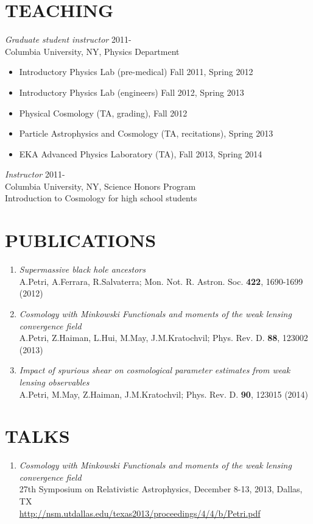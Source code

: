 \documentclass[margin, 10pt]{res} %
\begin{document}
\begin{resume}
\section{TEACHING} 
{\sl Graduate student instructor} \hfill 2011-\\ 
Columbia University, NY, Physics Department 
\begin{itemize}
\item Introductory Physics Lab (pre-medical) Fall 2011, Spring 2012
\item Introductory Physics Lab (engineers) Fall 2012, Spring 2013
\item Physical Cosmology (TA, grading), Fall 2012
\item Particle Astrophysics and Cosmology (TA, recitations), Spring 2013 
\item EKA Advanced Physics Laboratory (TA), Fall 2013, Spring 2014 
\end{itemize}

{\sl Instructor} \hfill 2011- \\
Columbia University, NY, Science Honors Program\\
Introduction to Cosmology for high school students

\section{PUBLICATIONS}
\begin{enumerate}
\item {\sl Supermassive black hole ancestors} \\
A.Petri, A.Ferrara, R.Salvaterra; Mon. Not. R. Astron. Soc. \textbf{422}, 1690-1699 (2012)
\item {\sl Cosmology with Minkowski Functionals and moments of the weak lensing convergence field} \\
A.Petri, Z.Haiman, L.Hui, M.May, J.M.Kratochvil; Phys. Rev. D. \textbf{88}, 123002 (2013)
\item {\sl Impact of spurious shear on cosmological parameter estimates from weak lensing observables} \\
A.Petri, M.May, Z.Haiman, J.M.Kratochvil; Phys. Rev. D. \textbf{90}, 123015 (2014)
\end{enumerate}

\section{TALKS}
\begin{enumerate}
\item{\sl Cosmology with Minkowski Functionals and moments of the weak lensing convergence field}\\
27th Symposium on Relativistic Astrophysics, December 8-13, 2013, Dallas, TX \\
\url{http://nsm.utdallas.edu/texas2013/proceedings/4/4/b/Petri.pdf}
\end{enumerate}


\end{resume}
\end{document}
